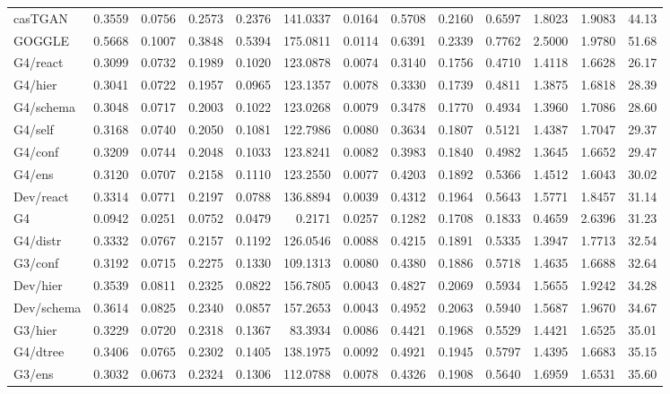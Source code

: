 \begin{table}[t]
\begin{tabular}{lrrrrrrrrrrrr}
casTGAN & 0.3559 & 0.0756 & 0.2573 & 0.2376 & 141.0337 & 0.0164 & 0.5708 & 0.2160 & 0.6597 & 1.8023 & 1.9083 & 44.13 \\
GOGGLE & 0.5668 & 0.1007 & 0.3848 & 0.5394 & 175.0811 & 0.0114 & 0.6391 & 0.2339 & 0.7762 & 2.5000 & 1.9780 & 51.68 \\
\midrule
G4/react & 0.3099 & 0.0732 & 0.1989 & 0.1020 & 123.0878 & 0.0074 & 0.3140 & 0.1756 & 0.4710 & 1.4118 & 1.6628 & 26.17 \\
G4/hier & 0.3041 & 0.0722 & 0.1957 & 0.0965 & 123.1357 & 0.0078 & 0.3330 & 0.1739 & 0.4811 & 1.3875 & 1.6818 & 28.39 \\
G4/schema & 0.3048 & 0.0717 & 0.2003 & 0.1022 & 123.0268 & 0.0079 & 0.3478 & 0.1770 & 0.4934 & 1.3960 & 1.7086 & 28.60 \\
G4/self & 0.3168 & 0.0740 & 0.2050 & 0.1081 & 122.7986 & 0.0080 & 0.3634 & 0.1807 & 0.5121 & 1.4387 & 1.7047 & 29.37 \\
G4/conf & 0.3209 & 0.0744 & 0.2048 & 0.1033 & 123.8241 & 0.0082 & 0.3983 & 0.1840 & 0.4982 & 1.3645 & 1.6652 & 29.47 \\
G4/ens & 0.3120 & 0.0707 & 0.2158 & 0.1110 & 123.2550 & 0.0077 & 0.4203 & 0.1892 & 0.5366 & 1.4512 & 1.6043 & 30.02 \\
Dev/react & 0.3314 & 0.0771 & 0.2197 & 0.0788 & 136.8894 & 0.0039 & 0.4312 & 0.1964 & 0.5643 & 1.5771 & 1.8457 & 31.14 \\
G4 & 0.0942 & 0.0251 & 0.0752 & 0.0479 & 0.2171 & 0.0257 & 0.1282 & 0.1708 & 0.1833 & 0.4659 & 2.6396 & 31.23 \\
G4/distr & 0.3332 & 0.0767 & 0.2157 & 0.1192 & 126.0546 & 0.0088 & 0.4215 & 0.1891 & 0.5335 & 1.3947 & 1.7713 & 32.54 \\
G3/conf & 0.3192 & 0.0715 & 0.2275 & 0.1330 & 109.1313 & 0.0080 & 0.4380 & 0.1886 & 0.5718 & 1.4635 & 1.6688 & 32.64 \\
Dev/hier & 0.3539 & 0.0811 & 0.2325 & 0.0822 & 156.7805 & 0.0043 & 0.4827 & 0.2069 & 0.5934 & 1.5655 & 1.9242 & 34.28 \\
Dev/schema & 0.3614 & 0.0825 & 0.2340 & 0.0857 & 157.2653 & 0.0043 & 0.4952 & 0.2063 & 0.5940 & 1.5687 & 1.9670 & 34.67 \\
G3/hier & 0.3229 & 0.0720 & 0.2318 & 0.1367 & 83.3934 & 0.0086 & 0.4421 & 0.1968 & 0.5529 & 1.4421 & 1.6525 & 35.01 \\
G4/dtree & 0.3406 & 0.0765 & 0.2302 & 0.1405 & 138.1975 & 0.0092 & 0.4921 & 0.1945 & 0.5797 & 1.4395 & 1.6683 & 35.15 \\
G3/ens & 0.3032 & 0.0673 & 0.2324 & 0.1306 & 112.0788 & 0.0078 & 0.4326 & 0.1908 & 0.5640 & 1.6959 & 1.6531 & 35.60 \\

\end{tabular}
\end{table}
